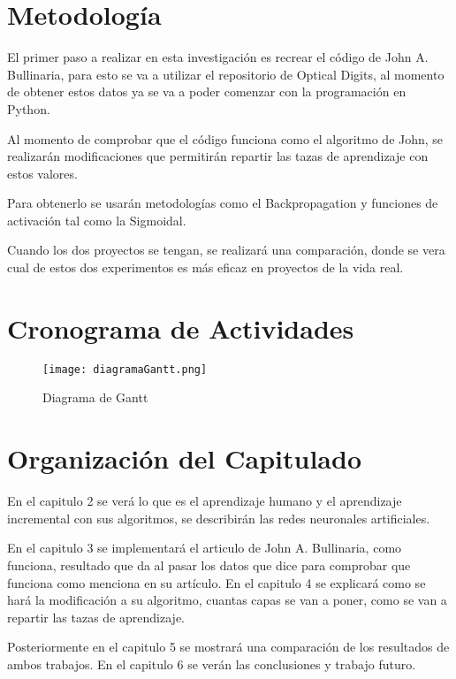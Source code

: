 \section{Metodología}
    El primer paso a realizar en esta investigación es recrear el código de John A. Bullinaria,
    para esto se va a utilizar el repositorio de Optical Digits, al momento de obtener estos datos
    ya se va a poder comenzar con la programación en Python.

    Al momento de comprobar que el código funciona como el algoritmo de John, se realizarán modificaciones
    que permitirán repartir las tazas de aprendizaje con estos valores.

    Para obtenerlo se usarán metodologías como el Backpropagation y funciones de activación tal como la Sigmoidal.

    Cuando los dos proyectos se tengan, se realizar\'a una comparación, donde se vera cual de estos dos experimentos
    es más eficaz en proyectos de la vida real.
    
\section{Cronograma de Actividades}

    \begin{figure}[H]
        \centering
        \texttt{[image: diagramaGantt.png]}
        \caption{Diagrama de Gantt}
        \label{fig:fig3}
    \end{figure}

\section{Organización del Capitulado}
	En el capitulo 2 se ver\'a lo que es el aprendizaje humano y el aprendizaje incremental con sus algoritmos, se describirán las redes neuronales artificiales.

En el capitulo 3 se implementar\'a el articulo de John A. Bullinaria, como funciona, resultado que da al pasar los datos que dice para comprobar que funciona como menciona en su art\'iculo. En el capitulo 4 se explicar\'a como se hará la modificación a su algoritmo, cuantas capas se van a poner, como se van a repartir las tazas de aprendizaje.

Posteriormente en el capitulo 5 se mostrar\'a una comparación de los resultados de ambos trabajos. En el capitulo 6 se verán las conclusiones y trabajo futuro.
